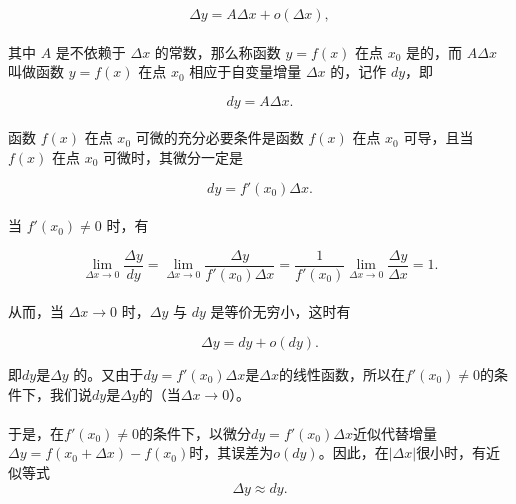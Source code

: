 \begin{equation}
\Delta y = A\Delta x + o(\Delta x),
\end{equation}

\paragraph{}
其中 $A$ 是不依赖于 $\Delta x$ 的常数，那么称函数 $y = f(x)$ 在点 $x_0$ 是的，而 $A\Delta x$ 叫做函数 $y = f(x)$ 在点 $x_0$ 相应于自变量增量 $\Delta x$ 的，记作 $dy$，即

\begin{equation}
dy = A\Delta x.
\end{equation}

\paragraph{}
函数 $f(x)$ 在点 $x_0$ 可微的充分必要条件是函数 $f(x)$ 在点 $x_0$ 可导，且当 $f(x)$ 在点 $x_0$ 可微时，其微分一定是

\begin{equation}
dy = f'(x_0)\Delta x.
\end{equation}

\paragraph{}
当 $f'(x_0) \neq 0$ 时，有

\begin{equation}
\lim_{\Delta x \to 0} \frac{\Delta y}{dy} = \lim_{\Delta x \to 0} \frac{\Delta y}{f'(x_0) \Delta x} = \frac{1}{f'(x_0)}\lim_{\Delta x \to 0}\frac{\Delta y}{\Delta x} = 1.
\end{equation}

\paragraph{}
从而，当 $\Delta x \to 0$ 时，$\Delta y$ 与 $dy$ 是等价无穷小，这时有

\begin{equation}
\Delta y = dy + o(dy).
\end{equation}

即$dy$是$\Delta y$ 的。又由于$dy = f'(x_0) \Delta x$是$\Delta x$的线性函数，所以在$f'(x_0) \neq 0$的条件下，我们说$dy$是$\Delta y$的（当$\Delta x \to 0$）。

\paragraph{}
于是，在$f'(x_0) \neq 0$的条件下，以微分$dy = f'(x_0)\Delta x$近似代替增量$\Delta y = f(x_0+\Delta x) - f(x_0)$时，其误差为$o(dy)$。因此，在$|\Delta x|$很小时，有近似等式
\begin{equation}
  \Delta y \approx dy.
\end{equation}

